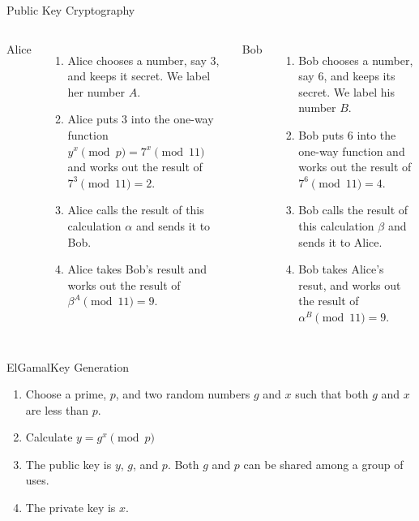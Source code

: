 \documentclass[utf8]{beamer}
\begin{document}
\begin{frame}{Public Key Cryptography}

 \begin{columns}[t]
   Alice
   \begin{enumerate}
   \item<1-> Alice chooses a number, say 3, and keeps it secret. We
     label her number $A$.
   \item<2-> Alice puts 3 into the one-way function $y^x\pmod p =
     7^x\pmod 11$ and works out the result of $7^3\pmod{11} = 2$.
   \item<3-> Alice calls the result of this calculation $\alpha$ and
     sends it to Bob.
   \item<4-> Alice takes Bob's result and works out the result of
     $\beta^A\pmod{11} = 9$.
   \end{enumerate}

  Bob
  \begin{enumerate}
  \item<1-> Bob chooses a number, say 6, and keeps its secret. We
    label his number $B$.
  \item<2-> Bob puts 6 into the one-way function and works out the
    result of $7^6\pmod{11} = 4$.
  \item<3-> Bob calls the result of this calculation $\beta$ and
    sends it to Alice.
  \item<4-> Bob takes Alice's resut, and works out the result of
    $\alpha^B\pmod{11} = 9$.
  \end{enumerate}  
\end{columns}

\end{frame}

\begin{frame}{ElGamal}{Key Generation}

  \begin{enumerate}
    \item Choose a prime, $p$, and two random numbers $g$ and $x$ such
      that both $g$ and $x$ are less than $p$.
    \item Calculate $y = g^x\pmod{p}$
    \item The public key is $y$, $g$, and $p$. Both $g$ and $p$ can be
      shared among a group of uses. 
    \item The private key is $x$.

  \end{enumerate}

\end{frame}
\end{document}

